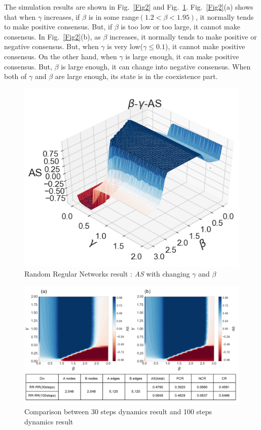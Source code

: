 \documentclass[english]{cccconf}
\begin{document}
The simulation results are shown in Fig.~\ref{Fig2} and Fig.~\ref{Fig3}. Fig.~\ref{Fig2}(a) shows that when $\gamma$ increases, if $\beta$ is in some range$(1.2 < \beta < 1.95)$, it normally tends to make positive consensus. But, if $\beta$ is too low or too large, it cannot make consensus.
In Fig.~\ref{Fig2}(b), as $\beta$ increases, it normally tends to make positive or negative consensus. But, when $\gamma$ is very low($\gamma \le 0.1$), it cannot make positive consensus. On the other hand, when $\gamma$ is large enough, it can make positive consensus. But, $\beta$ is large enough, it can change into negative consensus. When both of $\gamma$ and $\beta$ are large enough, its state is in the coexistence part. 
\begin{figure}[!htb]
	\centering
	\includegraphics[width=\hsize]{FIG3.png}
	\caption{Random Regular  Networks result : \textit{AS} with changing $\gamma$ and $\beta$}
	\label{Fig3}
\end{figure}
\begin{figure}[!htb]
	\centering
	\includegraphics[width=\hsize]{FIG4.png}
	\caption{Comparison between 30 steps dynamics result and 100 steps dynamics result}
	\label{Fig4}
\end{figure}
\end{document}

